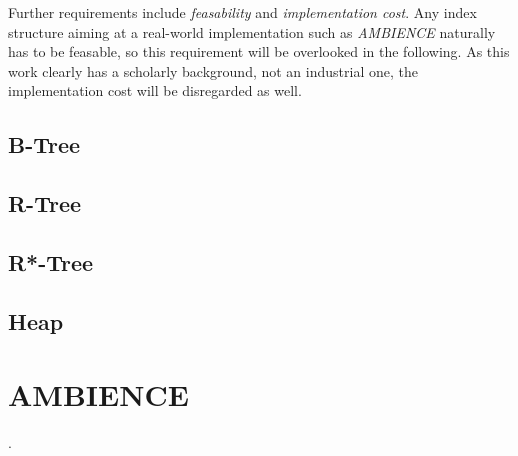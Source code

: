Further requirements include \textit{feasability} and \textit{implementation cost}. Any index structure aiming at a real-world implementation such as \textit{AMBIENCE} naturally has to be feasable, so this requirement will be overlooked in the following. As this work clearly has a scholarly background, not an industrial one, the implementation cost will be disregarded as well.\\ 
\cite{Ottmann2012}
\subsection{B-Tree}	
\cite{Knuth1998}	
\subsection{R-Tree}
\subsection{R*-Tree}
\subsection{Heap}
\section{AMBIENCE}\label{sec:ambience}
\cite{Werner2015}. 